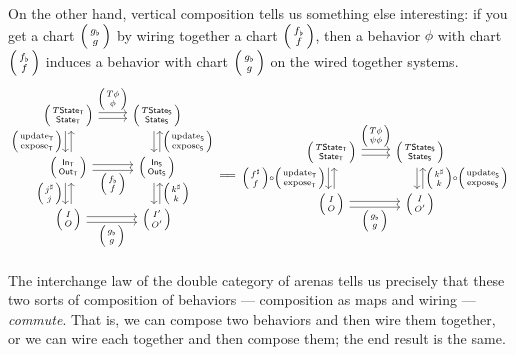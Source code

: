 \documentclass[DynamicalBook]{subfiles}
\begin{document}
On the other hand, vertical composition tells us something else interesting: if
you get a chart $\lens{g_{\flat}}{g}$ by wiring together a chart
$\lens{f_{\flat}}{f}$, then a behavior $\phi$ with
chart $\lens{f_{\flat}}{f}$ induces a behavior with chart $\lens{g_{\flat}}{g}$
on the wired together systems.
\[
  \begin{tikzcd}
    \lens{T\State{T}}{\State{T}} \ar[r, shift left, "\lens{T\phi}{\phi}"] \ar[r, shift right] \ar[d, shift right,
    "\lens{\update{T}}{\expose{T}}"'] \ar[d, shift left, leftarrow] &
    \lens{T\State{S}}{\State{S}} \ar[d, shift left, leftarrow,
    "\lens{\update{S}}{\expose{S}}"] \ar[d, shift right]\\
    \lens{\In{T}}{\Out{T}} \ar[d, shift right, "\lens{j^{\sharp}}{j}"'] \ar[d, shift left,
        leftarrow] \ar[r, shift right, "\lens{f_{\flat}}{f}"']
    \ar[r, shift left] & \lens{\In{S}}{\Out{S}} \ar[d, shift left, leftarrow,
        "\lens{k^{\sharp}}{k}"] \ar[d, shift right]\\
    \lens{I}{O} \ar[r, shift right, "\lens{g_{\flat}}{g}"']
    \ar[r, shift left] & \lens{I'}{O'} \\
  \end{tikzcd} \xequals{\quad}
  \begin{tikzcd}
    \lens{T\State{T}}{\State{T}} \ar[r, shift left, "\lens{T\phi}{\psi\phi}"] \ar[r, shift right] \ar[d, shift right,
    "\lens{f^{\sharp}}{f} \circ \lens{\update{T}}{\expose{T}}"'] \ar[d, shift left, leftarrow] &
    \lens{T\State{S}}{\State{S}} \ar[d, shift left, leftarrow,
    "\lens{k^{\sharp}}{k} \circ \lens{\update{S}}{\expose{S}}"] \ar[d, shift right]\\
    \lens{I}{O} \ar[r, shift right, "\lens{g_{\flat}}{g}"']
    \ar[r, shift left] & \lens{I}{O'}
  \end{tikzcd}
\]

The interchange law of the double category of arenas tells us precisely that
these two sorts of composition of behaviors --- composition as maps and wiring --- \emph{commute}. That is, we can
compose two behaviors and then wire them together, or we can wire each
together and then compose them; the end result is the same.
\end{document}
